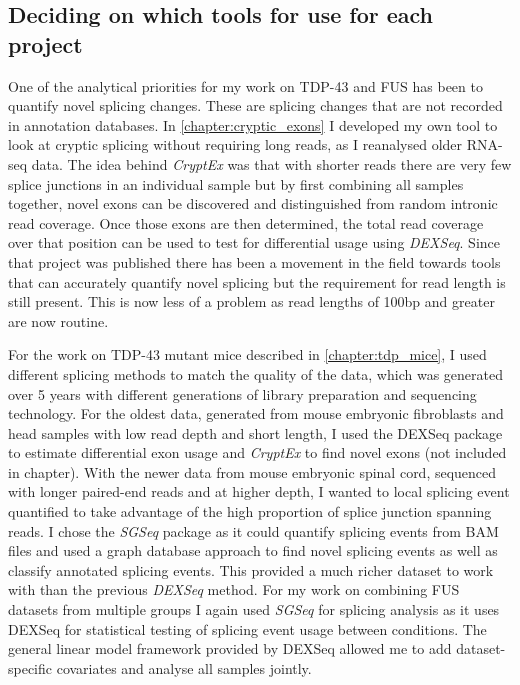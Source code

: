 
\subsection{Deciding on which tools for use for each project}

One of the analytical priorities for my work on TDP-43 and FUS has been to quantify novel splicing changes. These are splicing changes that are not recorded in annotation databases. In \autoref{chapter:cryptic_exons} I developed my own tool to look at cryptic splicing without requiring long reads, as I reanalysed older RNA-seq data. 
The idea behind \textit{CryptEx} was that with shorter reads there are very few splice junctions in an individual sample but by first combining all samples together, novel exons can be discovered and distinguished from random intronic read coverage. 
Once those exons are then determined, the total read coverage over that position can be used to test for differential usage using \textit{DEXSeq}. 
Since that project was published there has been a movement in the field towards tools that can accurately quantify novel splicing but the requirement for read length is still present.
This is now less of a problem as read lengths of 100bp and greater are now routine.

For the work on TDP-43 mutant mice described in \autoref{chapter:tdp_mice}, I used different splicing methods to match the quality of the data, which was generated over 5 years with different generations of library preparation and sequencing technology. For the oldest data, generated from mouse embryonic fibroblasts and head samples with low read depth and short length, I used the DEXSeq package to estimate differential exon usage and \textit{CryptEx} to find novel exons (not included in chapter).
With the newer data from mouse embryonic spinal cord, sequenced with longer paired-end reads and at higher depth, I wanted to local splicing event quantified to take advantage of the high proportion of splice junction spanning reads. 
I chose the \textit{SGSeq} package as it could quantify splicing events from BAM files and used a graph database approach to find novel splicing events as well as classify annotated splicing events. This provided a much richer dataset to work with than the previous \textit{DEXSeq} method.
For my work on combining FUS datasets from multiple groups I again used \textit{SGSeq} for splicing analysis as it uses DEXSeq for statistical testing of splicing event usage between conditions. The general linear model framework provided by DEXSeq allowed me to add dataset-specific covariates and analyse all samples jointly.


